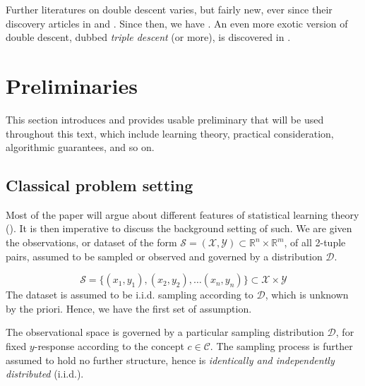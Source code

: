 \documentclass[10pt]{article} %
\begin{document}
Further literatures on double descent varies, but fairly new, ever since their discovery articles in \cite{belkin_reconciling_2019} and \cite{nakkiran_deep_2019}. Since then, we have \cite{shi2024homophilymodulatesdoubledescent,schaeffer_double_2023,quetu_can_2023,lafon_understanding_2024,neal2019biasvariancetradeofftextbooksneed,davies_unifying_2023,quetu_can_2023-1,liu2023understandingroleoptimizationdouble,mei2020generalizationerrorrandomfeatures,mei2019generalization,adlam2020understandingdoubledescentrequires,transtrum2025egaddoubledescentexplained,liu2021kernelregressionhighdimensions,allerbo2025changingkerneltrainingleads,pezeshki2021multiscalefeaturelearningdynamics,brellmann2024on,nakkiran2019moredata,mei2019randomfeatures,heckel2020early,nakkiran2020regularization,Belkin_2020,Yang_2024,spiess2023doublesingledescentcausal,nakkiran2021optimalregularizationmitigatedouble,zhang2024manipulatingsparsedoubledescent,cherkassky2024understand,nakkiran2019datahurtlinearregression}. An even more exotic version of double descent, dubbed \textit{triple descent} (or more), is discovered in \cite{d_ascoli_triple_2020}. 

\section{Preliminaries}

This section introduces and provides usable preliminary that will be used throughout this text, which include learning theory, practical consideration, algorithmic guarantees, and so on. 

\subsection{Classical problem setting}

Most of the paper will argue about different features of statistical learning theory (\cite{Sterkenburg_2024,Vapnik1999-VAPTNO,STL_Hajek_Maxim_2021}). It is then imperative to discuss the background setting of such. We are given the observations, or dataset of the form $\mathcal{S}=(\mathcal{X},\mathcal{Y})\subset \mathbb{R}^{n}\times \mathbb{R}^{m}$, of all 2-tuple pairs, assumed to be sampled or observed and governed by a distribution $\mathcal{D}$. 

\begin{equation*}
    \mathcal{S} = \{ (x_1,y_1), (x_2, y_2),\dots(x_n,y_n) \} \subset \mathcal{X}\times \mathcal{Y}
\end{equation*}
The dataset is assumed to be i.i.d. sampling according to $\mathcal{D}$, which is unknown by the priori. Hence, we have the first set of assumption. 
\begin{assumption}
The observational space is governed by a particular sampling distribution $\mathcal{D}$, for fixed $y$-response according to the concept $c\in \mathcal{C}$. The sampling process is further assumed to hold no further structure, hence is \textit{identically and independently distributed} (i.i.d.). 
\end{assumption}
\vspace{2mm}
\end{document}
